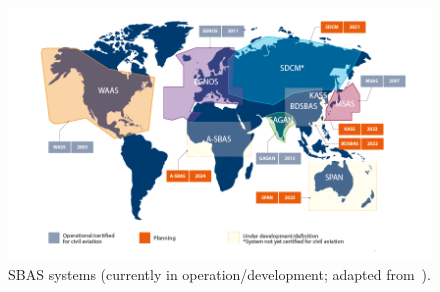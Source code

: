 \begin{figure}[ht]
	\centering
	\includegraphics[width=1.0\textwidth]{Chapters/Figures/SBAS.png}
	\caption{SBAS systems (currently in operation/development; adapted from~\cite{sbas_euspa_2021}).}
	\label{fig:SBAS_systems}
\end{figure}

